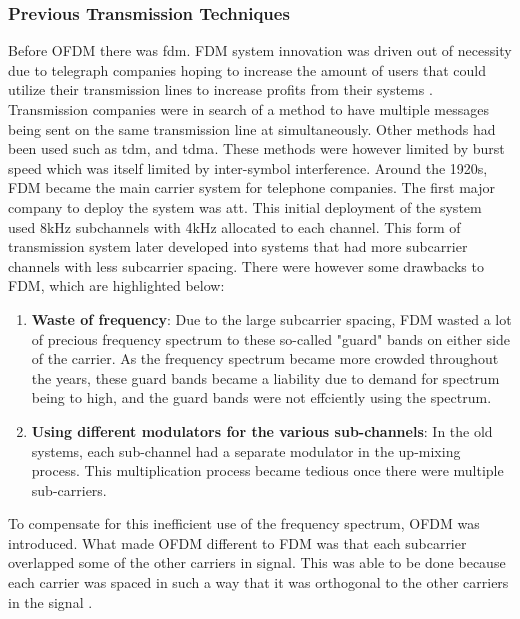 \documentclass[11pt]{report}
\begin{document}
\subsubsection{Previous Transmission Techniques}
Before OFDM there was \gls{fdm}. FDM system innovation was driven out of necessity due to telegraph companies hoping to increase the amount of users that could utilize their transmission lines to increase profits from their systems \cite{weinstein_history_2009}. Transmission companies were in search of a method to have multiple messages being sent on the same transmission line at simultaneously. Other methods had been used such as \gls{tdm}, and \gls{tdma}. These methods were however limited by burst speed which was itself limited by inter-symbol interference. Around the 1920s, FDM became the main carrier system for telephone companies. The first major company to deploy the system was \gls{att}. This initial deployment of the system used 8kHz subchannels with 4kHz allocated to each channel. This form of transmission system later developed into systems that had more subcarrier channels with less subcarrier spacing. There were however some drawbacks to FDM, which are highlighted below:

\begin{enumerate}
    \item \textbf{Waste of frequency}: Due to the large subcarrier spacing, FDM wasted a lot of precious frequency spectrum to these so-called "guard" bands on either side of the carrier. As the frequency spectrum became more crowded throughout the years, these guard bands became a liability due to demand for spectrum being to high, and the guard bands were not effciently using the spectrum.
    \item \textbf{Using different modulators for the various sub-channels}: In the old systems, each sub-channel had a separate modulator in the up-mixing process. This multiplication process became tedious once there were multiple sub-carriers.
\end{enumerate}

To compensate for this inefficient use of the frequency spectrum, OFDM was introduced. What made OFDM different to FDM was that each subcarrier overlapped some of the other carriers in signal. This was able to be done because each carrier was spaced in such a way that it was orthogonal to the other carriers in the signal \cite{weinstein_history_2009}.
\end{document}
